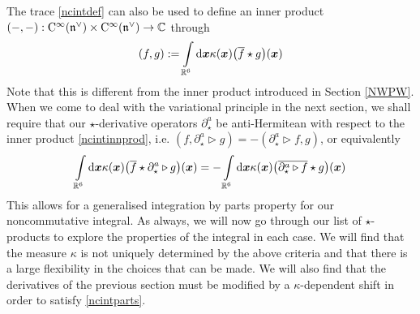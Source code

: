 The trace \eqref{ncintdef} can also be used to define an inner product
$(-,-):{\rm C}^\infty({\mathfrak n}^\vee)\times{\rm C}^\infty({\mathfrak n}^\vee)\to{\mathbb C}$ through
\begin{equation}
  \label{ncintinnprod}
  (f,g):=\int\limits_{{\mathbb R}^6} {\rm d}{\boldsymbol {x} } \kappa({\boldsymbol {x} }) \bigl( \overline{f}\star
  g\bigr)({\boldsymbol {x} })
\end{equation}
Note that this is different from the inner product introduced in Section
\ref{NWPW}. When we come to deal with the variational principle in the next
section, we shall require that our $\star$-derivative operators
$\partial^a_\star$ be anti-Hermitean with respect to the inner product
\eqref{ncintinnprod}, i.e. $(f,\partial^a_\star\triangleright
g)=-(\partial^a_\star\triangleright f,g)$, or equivalently
\begin{equation}
  \label{ncintparts}
  \int\limits_{{\mathbb R}^6} {\rm d}{\boldsymbol {x} } \kappa({\boldsymbol {x} }) \bigl( \overline{f}\star
  \partial_\star^a
  \triangleright g\bigr)({\boldsymbol {x} })=-\int\limits_{{\mathbb R}^6} {\rm d}{\boldsymbol {x} } \kappa({\boldsymbol {x} }) 
  \bigl( \overline{\partial_\star^a\triangleright f}\star g\bigr)({\boldsymbol {x} })
\end{equation}
This allows for a generalised integration by parts property
\cite{Dimitrijevic:2003wv} for our noncommutative integral. As always, we will
now go through our list of $\star$-products to explore the properties of the
integral in each case. We will find that the measure $\kappa$ is not uniquely
determined by the above criteria and that there is a large flexibility in the
choices that can be made. We will also find that the derivatives of the previous
section must be modified by a $\kappa$-dependent shift in order to satisfy
\eqref{ncintparts}.


